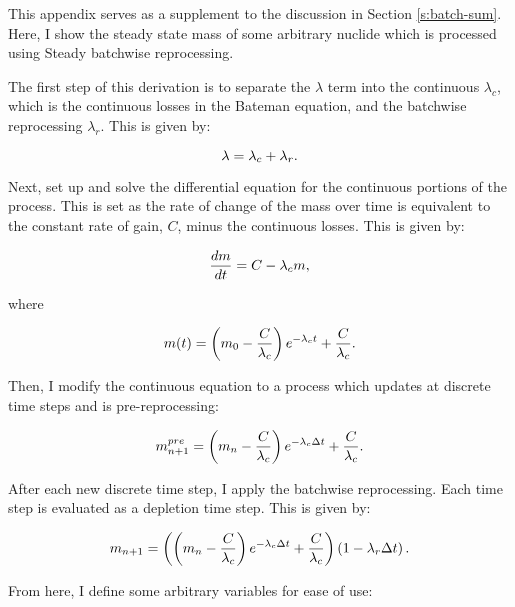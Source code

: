 \renewcommand{\theequation}{A\thechapter.\arabic{equation}}

This appendix serves as a supplement to the discussion in Section \ref{s:batch-sum}.
Here, I show the steady state mass of some arbitrary nuclide which is processed using Steady batchwise reprocessing.

The first step of this derivation is to separate the $\lambda$ term into the continuous $\lambda_c$, which is the continuous losses in the Bateman equation, and the batchwise reprocessing $\lambda_r$.
This is given by:

\begin{equation} \hfill
\lambda = \lambda_c + \lambda_r.
\hfill \end{equation}

Next, set up and solve the differential equation for the continuous portions of the process.
This is set as the rate of change of the mass over time is equivalent to the constant rate of gain, $C$, minus the continuous losses.
This is given by:

\begin{equation} \hfill
\frac{dm}{dt} = C - \lambda_c m,
\hfill \end{equation}

where

\begin{equation} \hfill
m(t) = \left(m_0 - \frac{C}{\lambda_c} \right) e^{-\lambda_c t}  + \frac{C}{\lambda_c}.
\hfill \end{equation}

Then, I modify the continuous equation to a process which updates at discrete time steps and is pre-reprocessing:

\begin{equation} \hfill
m_{n+1}^{pre} = \left(m_n - \frac{C}{\lambda_c} \right) e^{-\lambda_c \Delta t}  + \frac{C}{\lambda_c}.
\hfill \end{equation}

After each new discrete time step, I apply the batchwise reprocessing. 
Each time step is evaluated as a depletion time step.
This is given by:

\begin{equation} \hfill
m_{n+1} = \left(\left(m_n - \frac{C}{\lambda_c} \right) e^{-\lambda_c \Delta t}  + \frac{C}{\lambda_c}\right) \left(1 - {\lambda_r \Delta t} \right).
\hfill \label{eq:nplusone}\end{equation}

From here, I define some arbitrary variables for ease of use:

